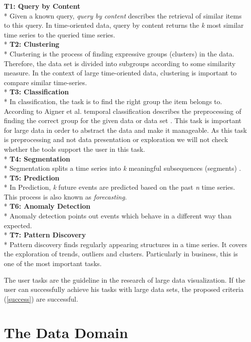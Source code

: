\textbf{T1: Query by Content}
\\*
Given a known query, \textit{query by content} describes the retrieval of similar items to this query. In time-oriented data, query by content returns the \textit{k} most similar time series to the queried time series.
\\*
\textbf{T2: Clustering}\\*
Clustering is the process of finding expressive groups (clusters) in the data. Therefore, the data set is divided into subgroups according to some similarity measure. In the context of large time-oriented data, clustering is important to compare similar time-series.
\\*
\textbf{T3: Classification}\\*
In classification, the task is to find the right group the item belongs to. According to Aigner et al. temporal classification describes the preprocessing of finding the correct group for the given data or data set \cite{Aigner2008}. This task is important for large data in order to abstract the data and make it manageable. As this task is preprocessing and not data presentation or exploration we will not check whether the tools support the user in this task. 
\\*
\textbf{T4: Segmentation}\\*
Segmentation splits a time series into \textit{k} meaningful subsequences (segments)  \cite{Batyrshin2007}. 
\\*
\textbf{T5: Prediction}\\*
In Prediction, \textit{k} future events are predicted based on the past \textit{n} time series. This process is also known as \textit{forecasting}. 
\\*
\textbf{T6: Anomaly Detection} \\*
Anomaly detection points out events which behave in a different way than expected.
\\*
\textbf{T7: Pattern Discovery}\\*
Pattern discovery finds regularly appearing structures in a time series.  It covers the exploration of trends, outliers and clusters. Particularly in business, this is one of the most important tasks.
\par
The user tasks are the guideline in the research of large data visualization. If the user can successfully achieve his tasks with large data sets, the proposed criteria (\ref{success}) are successful.


\section{The Data Domain} \label{data}

